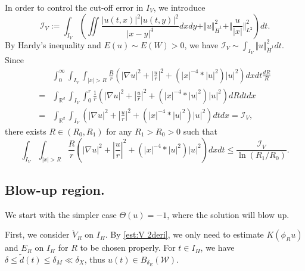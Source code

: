 \documentclass[reqno, 11pt]{amsart}
\numberwithin{equation}{section}
\newcommand{\R}{\mathbb{R}}
\theoremstyle{plain}
\theoremstyle{definition}
\numberwithin{equation}{section}
\numberwithin{theorem}{section}
\numberwithin{equation}{section}
\numberwithin{equation}{section}
\numberwithin{theorem}{section}
\begin{document}
	
	In order to control the cut-off error in $I_V$, we introduce
	\begin{equation*}
	\mathcal{I}_V:=\int_{I_V}\left(\iint \frac{\big|u(t,x)\big|^2\big|u(t,y)\big|^2}{|x-y|^4} dxdy+\Vert u \Vert_{\dot H^1}^2+\Vert \frac{u}{|x|} \Vert_{L^2}^2 \right) dt.
	\end{equation*}
	By Hardy's inequality and $E(u)\sim E(W)>0$, we have $\mathcal{I}_V\sim \int_{I_V} \Vert u \Vert_{\dot H^1}^2 dt$. Since
	\begin{equation*}
	\begin{aligned}
	&\int_{0}^{\infty} \int_{I_V} \int_{|x|>R} \frac{R}{r}\left( |\nabla u|^2+|\frac{u}{r}|^2+\left( |x|^{-4}*|u|^2\right)|u|^2 \right)dxdt\frac{dR}{R}\\=&\int_{\R^d}\int_{I_V} \int_{0}^{r}\frac1r \left( |\nabla u|^2+|\frac{u}{r}|^2+\left( |x|^{-4}*|u|^2\right)|u|^2 \right)dRdtdx\\=&\int_{\R^d}\int_{I_V}\left( |\nabla u|^2+|\frac{u}{r}|^2+\left( |x|^{-4}*|u|^2\right)|u|^2 \right)dtdx=\mathcal{I}_V,
	\end{aligned}
	\end{equation*}
	there exists $R\in(R_0,R_1)$ for any $R_{1}>R_{0}>0$ such that 
	\begin{equation}\label{est:IV int}
	\int_{I_V} \int_{|x|>R} \frac{R}{r}\left( |\nabla u|^2+|\frac{u}{r}|^2+\left( |x|^{-4}*|u|^2\right)|u|^2 \right)dxdt \leq \frac{\mathcal{I}_V}{\ln(R_{1}/R_{0})}.
	\end{equation}
	
	
	
	\subsection{Blow-up region.} We start with the simpler case $\Theta(u)=-1$, where the solution will blow up. 
	
	First, we consider $\ddot{V}_R$ on $I_H$. By \eqref{est:V 2deri}, we only need to estimate $K\left(\phi_{R}u\right)$ and $E_R$ on $I_H$ for $R$ to be chosen properly. For $t\in I_H$, we have $\delta\leq \widetilde{d}(t)\leq \delta_{M}\ll\delta_{X}$, thus $u(t)\in B_{\delta_{E}}(\mathcal{W})$.
	
\end{document}
